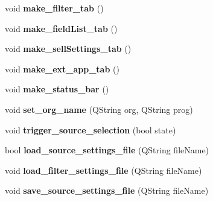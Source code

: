 \begin{DoxyCompactItemize}
\item 
\hypertarget{classcengen_a36b4a801cb832a65a58cccace8e1ba06}{void {\bfseries make\-\_\-filter\-\_\-tab} ()}\label{classcengen_a36b4a801cb832a65a58cccace8e1ba06}

\item 
\hypertarget{classcengen_a215a40d08692985cc97597c63683bd53}{void {\bfseries make\-\_\-field\-List\-\_\-tab} ()}\label{classcengen_a215a40d08692985cc97597c63683bd53}

\item 
\hypertarget{classcengen_ad787439c2301a4b24b2ff4d5158a0629}{void {\bfseries make\-\_\-sell\-Settings\-\_\-tab} ()}\label{classcengen_ad787439c2301a4b24b2ff4d5158a0629}

\item 
\hypertarget{classcengen_a56f6d240d305c46a75dca94f8639acfd}{void {\bfseries make\-\_\-ext\-\_\-app\-\_\-tab} ()}\label{classcengen_a56f6d240d305c46a75dca94f8639acfd}

\item 
\hypertarget{classcengen_af18ec54d894fa7af06178c39b592d359}{void {\bfseries make\-\_\-status\-\_\-bar} ()}\label{classcengen_af18ec54d894fa7af06178c39b592d359}

\item 
\hypertarget{classcengen_a95d217408ca71359b8b449b604870e60}{void {\bfseries set\-\_\-org\-\_\-name} (\-Q\-String org, \-Q\-String prog)}\label{classcengen_a95d217408ca71359b8b449b604870e60}

\item 
\hypertarget{classcengen_a1d416d9da303fdc35b3d5437464f2383}{void {\bfseries trigger\-\_\-source\-\_\-selection} (bool state)}\label{classcengen_a1d416d9da303fdc35b3d5437464f2383}

\item 
\hypertarget{classcengen_a8abb99a6b892651defb6e63884ceed0e}{bool {\bfseries load\-\_\-source\-\_\-settings\-\_\-file} (\-Q\-String file\-Name)}\label{classcengen_a8abb99a6b892651defb6e63884ceed0e}

\item 
\hypertarget{classcengen_a3528ae4ed1a4f335028fef3dcd7e3bd9}{void {\bfseries load\-\_\-filter\-\_\-settings\-\_\-file} (\-Q\-String file\-Name)}\label{classcengen_a3528ae4ed1a4f335028fef3dcd7e3bd9}

\item 
\hypertarget{classcengen_a740a3c3a9230caf5d428d877b79a340e}{void {\bfseries save\-\_\-source\-\_\-settings\-\_\-file} (\-Q\-String file\-Name)}\label{classcengen_a740a3c3a9230caf5d428d877b79a340e}


\end{DoxyCompactItemize}
